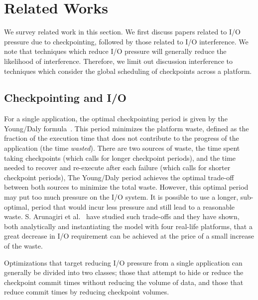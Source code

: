 

\section{Related Works}\label{sec:related}

We survey related work in this section. We first discuss papers related to I/O pressure
due to checkpointing, followed by those related to I/O interference.  We note that
techniques which reduce I/O pressure will generally reduce the likelihood of
interference.  Therefore, we limit out discussion interference to techniques which
consider the global scheduling of checkpoints across a platform.


\subsection{Checkpointing and I/O}

For a single application, the optimal checkpointing period is given by the
Young/Daly formula~\cite{young74,daly04}. This period minimizes the platform
waste, defined as the fraction of the execution time that does not contribute
to the progress of the application (the time \emph{wasted}).  There are two
sources of waste, the time spent taking checkpoints (which calls for longer
checkpoint periods), and the time needed to recover and re-execute after each
failure (which calls for shorter checkpoint periods), The Young/Daly period
achieves the optimal trade-off between both sources to minimize the total
waste.  However, this optimal period may put too much pressure on the I/O
system. It is possible to use a longer, sub-optimal, period that would incur
less pressure and still lead to a reasonable waste. S. Arunagiri et
al.~\cite{Arunagiri2009} have studied such trade-offs and they have shown, both
analytically and instantiating the model with four real-life platforms, that a
great decrease in I/O requirement can be achieved  at the price of a small
increase of the waste.

Optimizations that target reducing I/O pressure from a single application can
generally be divided into two classes; those that attempt to hide or reduce the
checkpoint commit times without reducing the volume of data, and those that
reduce commit times by reducing checkpoint volumes. 

